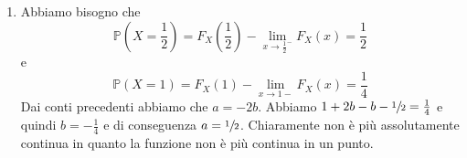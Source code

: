 \documentclass[a4paper]{article}
\begin{document}
\begin{snippetsolution}{}
\begin{enumerate}
\begin{align*}
                &= \int_{\realnumbers} x^2 f_X(x) \, dx \\
                &= \int_0^{\frac12} x^2 \, dx
                + \int_{\frac12}^1 x^2\left(2x-\frac12\right) \, dx \\
                &= \left[\frac{x^3}{3}\right]_0^{\frac12}
                + \int_{\frac12}^1 \left(2x^3-\frac{x^2}{2}\right) \, dx \\
                &= \frac{1}{24}
                + \left[\frac{x^4}{2} - \frac{x^3}{6}\right]_{\frac12}^1 \\
                &= \frac{1}{24} + \frac{31}{96}
                = \frac{35}{96}.
            \end{align*}
            Quindi
            \[
                \operatorname{Var}(X)
                =
                \mathbb E[X^2] - \mathbb E[X]^2
                =
                \frac{35}{96} - \left(\frac{25}{48}\right)^2
                =
                \frac{215}{2304}.
            \]
        \item Abbiamo bisogno che \[
                \mathbb P\left(X = \frac12\right) = F_X\left(\frac12\right)
                - \lim_{x \to {\frac{1}{2}}^-} F_X(x) = \frac 12
            \]
            e
            \[
                \mathbb P(X = 1) = F_X\left(1\right)
                - \lim_{x \to 1-} F_X(x) = \frac 14
            \]
            Dai conti precedenti abbiamo che \(a=-2b\).
            Abbiamo \(1 + 2b - b - \sfrac12 = \frac14\)
            e quindi \(b=-\frac14\) e di conseguenza \(a=\sfrac12\).
            Chiaramente non è più assolutamente continua in quanto la funzione non è più continua
            in un punto.
    \end{enumerate}
\end{snippetsolution}
\end{document}
